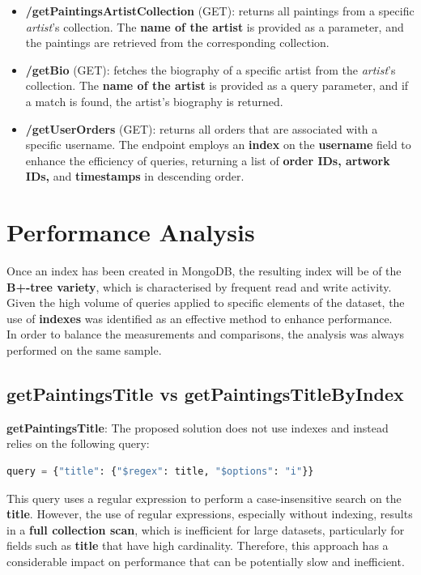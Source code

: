 \documentclass[a4paper,12pt]{article}
\begin{document}
\begin{itemize}
      \item \textbf{/getPaintingsArtistCollection} (GET): returns all paintings from a specific \textit{artist}'s collection. The \textbf{name of the artist} is provided as a parameter, and the paintings are retrieved from the corresponding collection.

      \item \textbf{/getBio} (GET): fetches the biography of a specific artist from the \textit{artist}'s collection. The \textbf{name of the artist} is provided as a query parameter, and if a match is found, the artist's biography is returned.

      \item \textbf{/getUserOrders} (GET): returns all orders that are associated with a specific username. The endpoint employs an \textbf{index} on the \textbf{username} field to enhance the efficiency of queries, returning a list of \textbf{order IDs, artwork IDs,} and \textbf{timestamps} in descending order.

\end{itemize}

\section{Performance Analysis}

Once an index has been created in MongoDB, the resulting index will be of the \textbf{B+-tree variety}, which is characterised by frequent read and write activity.
Given the high volume of queries applied to specific elements of the dataset, the use of \textbf{indexes} was identified as an effective method to enhance performance. \\
In order to balance the measurements and comparisons, the analysis was always performed on the same sample.

\subsection{getPaintingsTitle vs getPaintingsTitleByIndex}


\textbf{getPaintingsTitle}: The proposed solution does not use indexes and instead relies on the following query:
\begin{lstlisting}[language=Python]
query = {"title": {"$regex": title, "$options": "i"}}
\end{lstlisting}
This query uses a regular expression to perform a case-insensitive search on the \textbf{title}. However, the use of regular expressions, especially without indexing, results in a \textbf{full collection scan}, which is inefficient for large datasets, particularly for fields such as \textbf{title} that have high cardinality. Therefore, this approach has a considerable impact on performance that can be potentially slow and inefficient.
\end{document}
